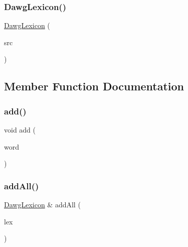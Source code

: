 \mbox{\label{classDawgLexicon_a74910e5f5679d365aad6a6c47f00c655}} 
\subsubsection{\texorpdfstring{Dawg\+Lexicon()}{DawgLexicon()}\hspace{0.1cm}{\footnotesize\ttfamily [5/5]}}
{\footnotesize\ttfamily \mbox{\hyperlink{classDawgLexicon}{Dawg\+Lexicon}} (\begin{DoxyParamCaption}\item[{const \mbox{\hyperlink{classDawgLexicon}{Dawg\+Lexicon}} \&}]{src }\end{DoxyParamCaption})}



\subsection{Member Function Documentation}
\mbox{\label{classDawgLexicon_a8713d0dbe1a2aa37acf4a75ea3c5bf40}} 
\subsubsection{\texorpdfstring{add()}{add()}}
{\footnotesize\ttfamily void add (\begin{DoxyParamCaption}\item[{const std\+::string \&}]{word }\end{DoxyParamCaption})}

\mbox{\label{classDawgLexicon_abcb16967ab02dd1106a92f2a93d8a13c}} 
\subsubsection{\texorpdfstring{add\+All()}{addAll()}\hspace{0.1cm}{\footnotesize\ttfamily [1/2]}}
{\footnotesize\ttfamily \mbox{\hyperlink{classDawgLexicon}{Dawg\+Lexicon}} \& add\+All (\begin{DoxyParamCaption}\item[{const \mbox{\hyperlink{classDawgLexicon}{Dawg\+Lexicon}} \&}]{lex }\end{DoxyParamCaption})}

